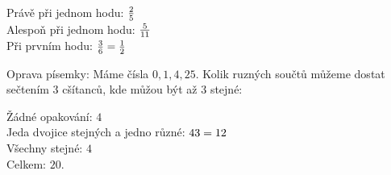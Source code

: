 Právě při jednom hodu: $\frac 2 5$\\
Alespoň při jednom hodu: $\frac 5 {11}$\\
Při prvním hodu: $\frac 3 6 = \frac 1 2$

\Pr Oprava písemky: Máme čísla $0,1,4,25$. Kolik ruzných součtů můžeme dostat sečtením 3 cšítanců, kde můžou být až 3 stejné:

Žádné opakování: $4$\\
Jeda dvojice stejných a jedno různé: $4\*3=12$\\
Všechny stejné: $4$\\
Celkem: $20$.

\EndDoc

